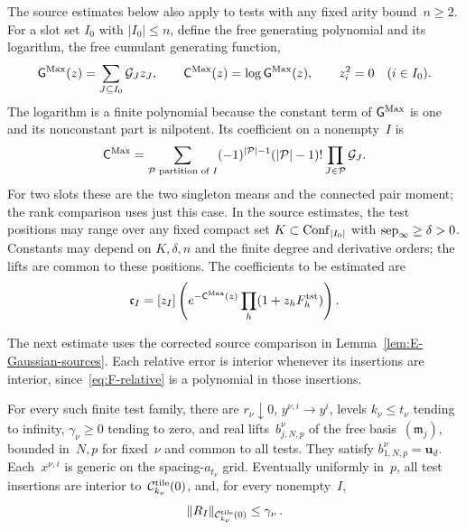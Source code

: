 The source estimates below also apply to tests with any fixed arity bound~$n\ge2$. For a slot set $I_0$ with $|I_0|\le n$, define the free generating polynomial and its logarithm, the free cumulant generating function,
\begin{equation*}
 \mathsf G^{\rm Max}(z)=\sum_{J\subseteq I_0}\mathcal G_Jz_J,
 \qquad \mathsf C^{\rm Max}(z)=\log\mathsf G^{\rm Max}(z),
 \qquad z_i^2=0\quad(i\in I_0).
\end{equation*}
The logarithm is a finite polynomial because the constant term of $\mathsf G^{\rm Max}$ is one and its nonconstant part is nilpotent. Its coefficient on a nonempty~$I$ is
\begin{equation*}
 [z_I]\mathsf C^{\rm Max}
 =\sum_{\mathcal P\text{ partition of }I}
 (-1)^{|\mathcal P|-1}(|\mathcal P|-1)!
 \prod_{J\in\mathcal P}\mathcal G_J.
\end{equation*}
For two slots these are the two singleton means and the connected pair moment; the rank comparison uses just this case. In the source estimates, the test positions may range over any fixed compact set $K\subset\mathrm{Conf}_{|I_0|}$ with $\operatorname{sep}_{\infty}\ge\delta>0$. Constants may depend on $K,\delta,n$ and the finite degree and derivative orders; the lifts are common to these positions. The coefficients to be estimated are
\begin{equation}\label{eq:E-corrected-coefficients}
 \mathfrak c_I=[z_I]\left(e^{-\mathsf C^{\rm Max}(z)}\prod_h(1+z_hF_h^{\rm tst})\right).
\end{equation}



The next estimate uses the corrected source comparison in Lemma~\ref{lem:E-Gaussian-sources}. Each relative error is interior whenever its insertions are interior, since~\eqref{eq:F-relative} is a polynomial in those insertions.
\begin{lemma}\label{lem:E2.10}
For every such finite test family, there are $r_\nu\downarrow0$, $y^{\nu,i}\to y^i$, levels $k_\nu\le t_\nu$ tending to infinity, $\gamma_\nu\ge0$ tending to zero, and real lifts~$b^\nu_{j,N,p}$ of the free basis~$(\mathfrak m_j)$, bounded in~$N,p$ for fixed~$\nu$ and common to all tests. They satisfy $b^\nu_{1,N,p}=\mathbf u_d$. Each~$x^{\nu,i}$ is generic on the spacing-$a_{t_\nu}$ grid. Eventually uniformly in~$p$, all test insertions are interior to~$\mathcal C^{\rm tile}_{k_\nu}(0)$, and, for every nonempty~$I$,
\begin{equation*}
\|R_I\|_{\mathcal C^{\rm tile}_{k_\nu}(0)}\le\gamma_\nu\,.
\end{equation*}
\end{lemma}

